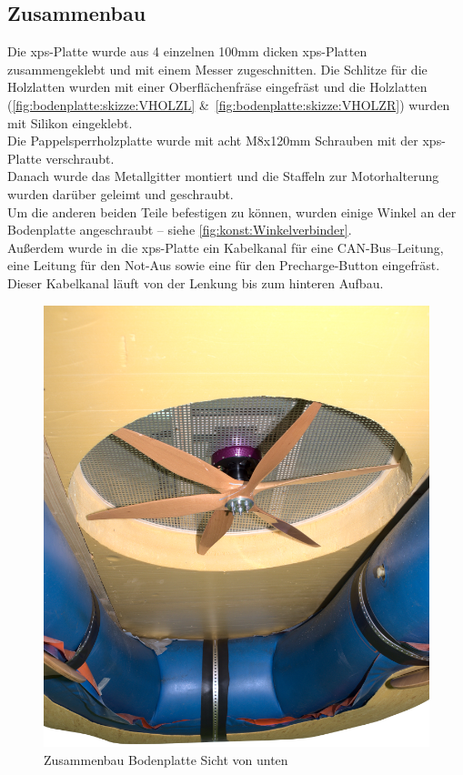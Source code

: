 \subsection{Zusammenbau}
Die \acs{xps}-Platte wurde aus 4 einzelnen 100mm dicken \acs{xps}-Platten zusammengeklebt und mit einem Messer zugeschnitten. Die Schlitze für die Holzlatten wurden mit einer Oberflächenfräse eingefräst und die Holzlatten (\autoref{fig:bodenplatte:skizze:VHOLZL} \&\ \autoref{fig:bodenplatte:skizze:VHOLZR}) wurden mit Silikon eingeklebt.\\
Die Pappelsperrholzplatte wurde mit acht M8x120mm Schrauben mit der \acs{xps}-Platte verschraubt.\\
Danach wurde das Metallgitter montiert und die Staffeln zur Motorhalterung wurden darüber geleimt und geschraubt.\\
Um die anderen beiden Teile befestigen zu können, wurden einige Winkel an der Bodenplatte angeschraubt -- siehe \autoref{fig:konst:Winkelverbinder}.\\
Außerdem wurde in die \acs{xps}-Platte ein Kabelkanal für eine CAN-Bus--Leitung, eine Leitung für den Not-Aus sowie eine für den Precharge-Button eingefräst. Dieser Kabelkanal läuft von der Lenkung bis zum hinteren Aufbau.
\begin{figure}[H]
    \centering
    \includegraphics[width=.6\textwidth]{Fotos/Konstruktion/DSC_8600.png}
    \caption{Zusammenbau Bodenplatte Sicht von unten}    
\end{figure}

